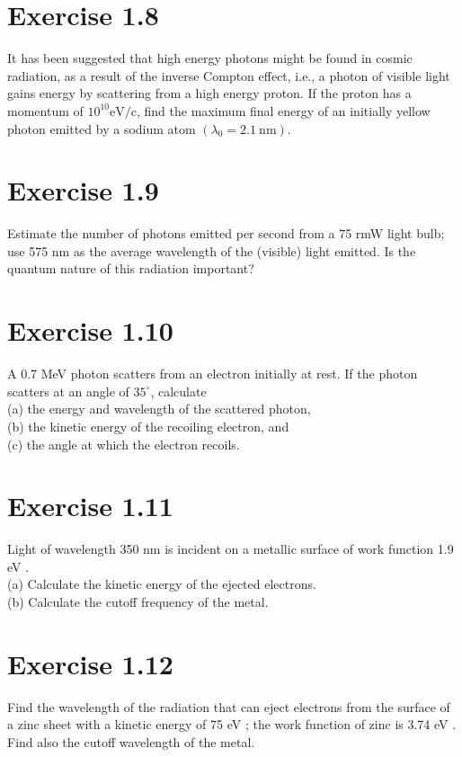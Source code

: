 \documentclass[10pt]{article}
\begin{document}
\section*{Exercise 1.8}
It has been suggested that high energy photons might be found in cosmic radiation, as a result of the inverse Compton effect, i.e., a photon of visible light gains energy by scattering from a high energy proton. If the proton has a momentum of $10^{10} \mathrm{eV} / \mathrm{c}$, find the maximum final energy of an initially yellow photon emitted by a sodium atom $\left(\lambda_{0}=2.1 \mathrm{~nm}\right)$.

\section*{Exercise 1.9}
Estimate the number of photons emitted per second from a 75 rmW light bulb; use 575 nm as the average wavelength of the (visible) light emitted. Is the quantum nature of this radiation important?

\section*{Exercise 1.10}
A 0.7 MeV photon scatters from an electron initially at rest. If the photon scatters at an angle of $35^{\circ}$, calculate\\
(a) the energy and wavelength of the scattered photon,\\
(b) the kinetic energy of the recoiling electron, and\\
(c) the angle at which the electron recoils.

\section*{Exercise 1.11}
Light of wavelength 350 nm is incident on a metallic surface of work function 1.9 eV .\\
(a) Calculate the kinetic energy of the ejected electrons.\\
(b) Calculate the cutoff frequency of the metal.

\section*{Exercise 1.12}
Find the wavelength of the radiation that can eject electrons from the surface of a zinc sheet with a kinetic energy of 75 eV ; the work function of zinc is 3.74 eV . Find also the cutoff wavelength of the metal.
\end{document}
